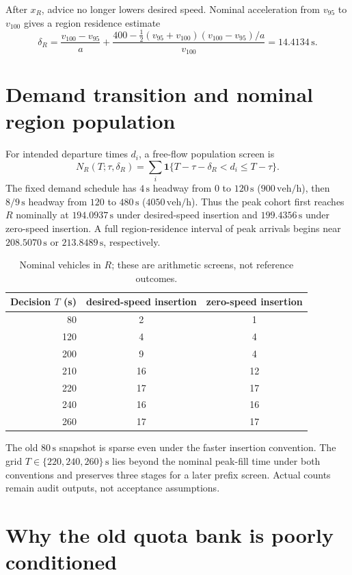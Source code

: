 \documentclass[11pt]{article}
\newcommand{\unit}[1]{\,\mathrm{#1}}
\begin{document}
After $x_R$, advice no longer lowers desired speed.  Nominal acceleration from
$v_{95}$ to $v_{100}$ gives a region residence estimate
\[
\delta_R=\frac{v_{100}-v_{95}}{a}+
\frac{400-\tfrac12(v_{95}+v_{100})(v_{100}-v_{95})/a}{v_{100}}
=14.4134\unit{s}.
\]

\section{Demand transition and nominal region population}

For intended departure times $d_i$, a free-flow population screen is
\[
N_R(T;\tau,\delta_R)=
\sum_i \mathbf{1}\{T-\tau-\delta_R<d_i\leq T-\tau\}.
\]
The fixed demand schedule has $4\unit{s}$ headway from $0$ to $120\unit{s}$
($900\unit{veh/h}$), then $8/9\unit{s}$ headway from $120$ to $480\unit{s}$
($4050\unit{veh/h}$).  Thus the peak cohort first reaches $R$ nominally at
$194.0937\unit{s}$ under desired-speed insertion and $199.4356\unit{s}$ under
zero-speed insertion.  A full region-residence interval of peak arrivals begins
near $208.5070\unit{s}$ or $213.8489\unit{s}$, respectively.

\begin{table}[h]
\centering
\caption{Nominal vehicles in $R$; these are arithmetic screens, not reference outcomes.}
\begin{tabular}{@{}rcc@{}}
\toprule
Decision $T$ (s) & desired-speed insertion & zero-speed insertion \\
\midrule
80  & 2  & 1 \\
120 & 4  & 4 \\
200 & 9  & 4 \\
210 & 16 & 12 \\
220 & 17 & 17 \\
240 & 16 & 16 \\
260 & 17 & 17 \\
\bottomrule
\end{tabular}
\end{table}

The old $80\unit{s}$ snapshot is sparse even under the faster insertion
convention.  The grid $T\in\{220,240,260\}\unit{s}$ lies beyond the nominal
peak-fill time under both conventions and preserves three stages for a later
prefix screen.  Actual counts remain audit outputs, not acceptance assumptions.

\section{Why the old quota bank is poorly conditioned}
\end{document}
